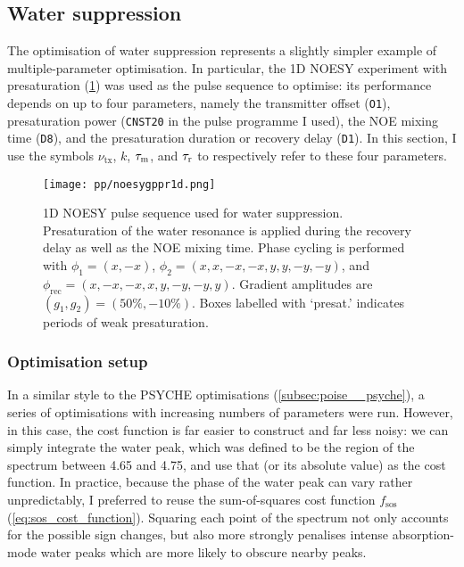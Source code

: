 \subsection{Water suppression}
\label{subsec:poise__solvsupp}

The optimisation of water suppression represents a slightly simpler example of multiple-parameter optimisation.
In particular, the 1D NOESY experiment with presaturation (\cref{fig:poise_solvsupp_pulseq}) was used as the pulse sequence to optimise\autocite{Mckay2011CMR}: its performance depends on up to four parameters, namely the transmitter offset (\texttt{O1}), presaturation power (\texttt{CNST20} in the pulse programme I used), the NOE mixing time (\texttt{D8}), and the presaturation duration or recovery delay (\texttt{D1}).
In this section, I use the symbols $\nu_\text{tx}$, $k$, $\tau_\mathrm{m}$, and $\tau_\mathrm{r}$ to respectively refer to these four parameters.

\begin{figure}[htb]
    \centering
    \texttt{[image: pp/noesygppr1d.png]}%
    \caption[1D NOESY pulse sequence for water suppression]{
        1D NOESY pulse sequence used for water suppression.
        Presaturation of the water resonance is applied during the recovery delay as well as the NOE mixing time.
        Phase cycling is performed with $\phi_1 = (x, -x)$, $\phi_2 = (x, x, -x, -x, y, y, -y, -y)$, and $\phi_\text{rec} = (x, -x, -x, x, y, -y, -y, y)$.
        Gradient amplitudes are $(g_1, g_2) = (50\%, -10\%)$.
        Boxes labelled with `presat.' indicates periods of weak presaturation.
    }
    \label{fig:poise_solvsupp_pulseq}
\end{figure}


\subsubsection{Optimisation setup}

In a similar style to the PSYCHE optimisations (\cref{subsec:poise__psyche}), a series of optimisations with increasing numbers of parameters were run.
However, in this case, the cost function is far easier to construct and far less noisy: we can simply integrate the water peak, which was defined to be the region of the spectrum between 4.65 and \SI{4.75}{\ppm}, and use that (or its absolute value) as the cost function.
In practice, because the phase of the water peak can vary rather unpredictably, I preferred to reuse the sum-of-squares cost function $f_\text{sos}$ (\cref{eq:sos_cost_function}).
Squaring each point of the spectrum not only accounts for the possible sign changes, but also more strongly penalises intense absorption-mode water peaks which are more likely to obscure nearby peaks.

